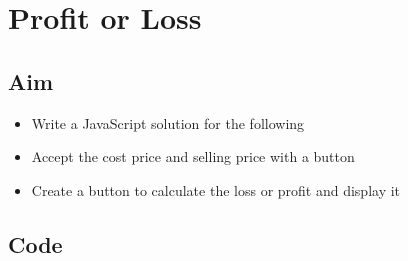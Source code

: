 \documentclass{article}
\begin{document}
\section{Profit or Loss}
\subsection{Aim}
\begin{itemize}
	\item Write a JavaScript solution for the following
	\item Accept the cost price and selling price with a button
	\item Create a button to calculate the loss or profit and display it
\end{itemize}

\subsection{Code}
\inputminted[frame=lines, linenos, breaklines, breakanywhere, numberblanklines=false]{html}{./prog_6/index.html}
\end{document}
